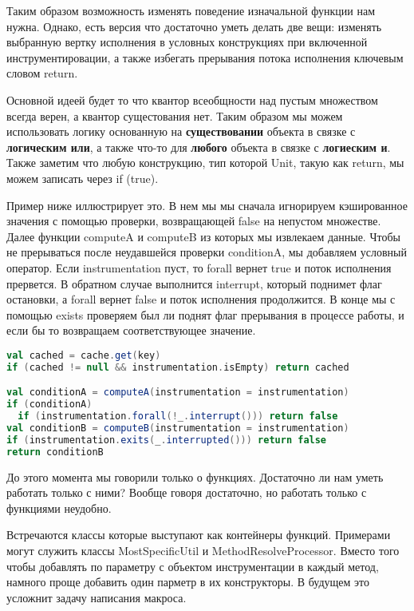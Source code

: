Таким образом возможность изменять поведение изначальной функции нам нужна.
Однако, есть версия что достаточно уметь делать две вещи:
изменять выбранную вертку исполнения в условных конструкциях при включенной
инструментировации, а также избегать прерывания потока исполнения ключевым словом return.

Основной идеей будет то что квантор всеобщности над пустым множеством всегда
верен, а квантор сущестования нет.
Таким образом мы можем использовать логику основанную на \textbf{существовании} объекта
в связке с \textbf{логическим или}, а также что-то для \textbf{любого} объекта
в связке с \textbf{логиеским и}.
Также заметим что любую конструкцию, тип которой Unit, такую как return,
мы можем записать через if (true).

Пример ниже иллюстрирует это.
В нем мы мы сначала игнорируем кэшированное значения с помощью проверки,
возвращающей false на непустом множестве.
Далее функции computeA и computeB из которых мы извлекаем данные.
Чтобы не прерываться после неудавшейся проверки conditionA, мы добавляем
условный оператор.
Если instrumentation пуст, то forall вернет true и поток исполнения прервется.
В обратном случае выполнится interrupt, который поднимет флаг остановки, а
forall вернет false и поток исполнения продолжится.
В конце мы с помощью exists проверяем был ли поднят флаг прерывания в процессе работы,
и если бы то возвращаем соответствующее значение.

\begin{samepage}
\begin{lstlisting}[language=scala,basicstyle=\ttfamily,keywordstyle=\color{red}]
val cached = cache.get(key)
if (cached != null && instrumentation.isEmpty) return cached

val conditionA = computeA(instrumentation = instrumentation)
if (conditionA)
  if (instrumentation.forall(!_.interrupt())) return false
val conditionB = computeB(instrumentation = instrumentation)
if (instrumentation.exits(_.interrupted())) return false
return conditionB
\end{lstlisting}
\end{samepage}

До этого момента мы говорили только о функциях.
Достаточно ли нам уметь работать только с ними?
Вообще говоря достаточно, но работать только с функциями неудобно.

Встречаются классы которые выступают как контейнеры функций.
Примерами могут служить классы MostSpecificUtil и MethodResolveProcessor.
Вместо того чтобы добавлять по параметру с объектом инструментации в каждый
метод, намного проще добавить один парметр в их конструкторы.
В будущем это усложнит задачу написания макроса.

